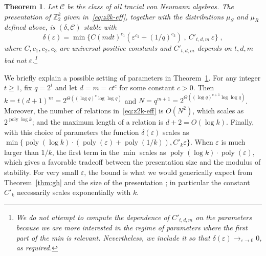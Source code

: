 \documentclass[11pt]{article}
\newtheorem{theorem}{Theorem}[section]
\theoremstyle{definition}
\newcommand{\Z}{\ensuremath{\mathbb{Z}}}
\newcommand{\mC}{\ensuremath{\mathcal{C}}}
\DeclareMathOperator{\poly}{poly}
\newcommand{\eps}{\varepsilon}
\begin{document}
\begin{theorem}\label{thm:z2-stab}
Let $\mC$ be the class of all tracial von Neumann algebras. 
The presentation of  $\Z_2^k$ given in~\eqref{eq:z2k-eff}, together with the distributions $\mu_S$ and $\mu_R$ defined above, is $(\delta,\mC)$ stable with 
\begin{equation}\label{eq:th-min}
 \delta(\eps) = \min\Big\{ C (mdt)^{c_1} (\eps^{c_2}+(1/q)^{c_3})\ ,\ C'_{t,d,m}\ \eps\Big\}\;,
\end{equation}
where $C,c_1,c_2,c_3$ are universal positive constants and $C'_{t,d,m}$ depends on $t,d,m$ but not $\eps$.\footnote{We do not attempt to compute the dependence of $C'_{t,d,m}$ on the parameters because we are more interested in the regime of parameters where the first part of the min is relevant. Nevertheless, we include it so that $\delta(\eps)\to_{\eps\to 0} 0$, as required.}   
\end{theorem}

We briefly explain a possible setting of parameters in Theorem~\ref{thm:z2-stab}. For any integer $t\geq 1$, fix $q=2^t$ and let $d=m=c t^c$ for some constant $c>0$. Then $k=t(d+1)^m = 2^{\Theta((\log q)^c \log\log q)}$ and $N=q^{m+1}= 2^{\Theta((\log q)^{c+1} \log\log q)}$. Moreover, the number of relations in~\eqref{eq:z2k-eff} is $O(N^2)$, which scales as $2^{\poly\log k}$; and the maximum length of a relation is $d+2=O(\log k)$. Finally, with this choice of parameters the function $\delta(\eps)$ scales as $\min\{ \poly(\log k)\cdot (\poly(\eps) + \poly(1/k)),C'_k\eps\}$. When $\eps$ is much larger than $1/k$, the first term in the $\min$ scales as $\poly(\log k)\cdot \poly(\eps)$, which gives a favorable tradeoff between the presentation size and the modulus of stability. For very small $\eps$, the bound is what we would generically expect from Theorem~\ref{thm:gh} and the size of the presentation ; in particular the constant $C'_k$ necessarily scales exponentially with $k$. 
\end{document}
